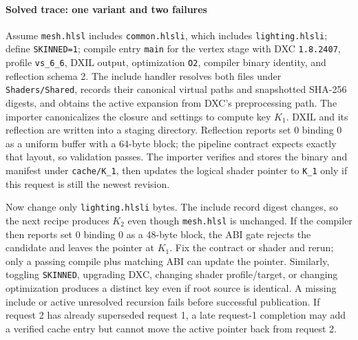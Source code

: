 \paragraph{Solved trace: one variant and two failures}\label{solved-trace-one-variant-and-two-failures}

Assume \texttt{mesh.hlsl} includes \texttt{common.hlsli}, which includes \texttt{lighting.hlsli}; define \texttt{SKINNED=1}; compile entry \texttt{main} for the vertex stage with DXC \texttt{1.8.2407}, profile \texttt{vs\_6\_6}, DXIL output, optimization \texttt{O2}, compiler binary identity, and reflection schema 2. The include handler resolves both files under \texttt{Shaders/Shared}, records their canonical virtual paths and snapshotted SHA-256 digests, and obtains the active expansion from DXC's preprocessing path. The importer canonicalizes the closure and settings to compute key \(K_1\). DXIL and its reflection are written into a staging directory. Reflection reports set 0 binding 0 as a uniform buffer with a 64-byte block; the pipeline contract expects exactly that layout, so validation passes. The importer verifies and stores the binary and manifest under \texttt{cache/K\_1}, then updates the logical shader pointer to \texttt{K\_1} only if this request is still the newest revision.

Now change only \texttt{lighting.hlsli} bytes. The include record digest changes, so the next recipe produces \(K_2\) even though \texttt{mesh.hlsl} is unchanged. If the compiler then reports set 0 binding 0 as a 48-byte block, the ABI gate rejects the candidate and leaves the pointer at \(K_1\). Fix the contract or shader and rerun; only a passing compile plus matching ABI can update the pointer. Similarly, toggling \texttt{SKINNED}, upgrading DXC, changing shader profile/target, or changing optimization produces a distinct key even if root source is identical. A missing include or active unresolved recursion fails before successful publication. If request 2 has already superseded request 1, a late request-1 completion may add a verified cache entry but cannot move the active pointer back from request 2.

